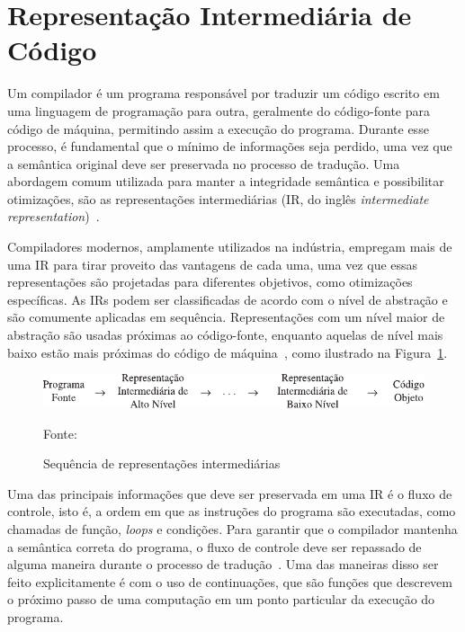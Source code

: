 \section{Representação Intermediária de Código}\label{sec:IR}

Um compilador é um programa responsável por traduzir um código escrito em uma linguagem de programação para outra, geralmente do código-fonte para código de máquina, permitindo assim a execução do programa.
Durante esse processo, é fundamental que o mínimo de informações seja perdido, uma vez que a semântica original deve ser preservada no processo de tradução.
Uma abordagem comum utilizada para manter a integridade semântica e possibilitar otimizações, são as representações intermediárias (IR, do inglês \textit{intermediate representation})~\cite{cooper2014construindo}.

Compiladores modernos, amplamente utilizados na indústria, empregam mais de uma IR para tirar proveito das vantagens de cada uma, uma vez que essas representações são projetadas para diferentes objetivos, como otimizações específicas.
As IRs podem ser classificadas de acordo com o nível de abstração e são comumente aplicadas em sequência.
Representações com um nível maior de abstração são usadas próximas ao código-fonte, enquanto aquelas de nível mais baixo estão mais próximas do código de máquina~\cite{aho2008compilers}, como ilustrado na Figura~\ref{fig:abstraction-level-irs}.

\begin{figure}[ht!]
  \centering
  \includegraphics[width=\textwidth]{Imagens/abstraction-level-irs.pdf}
  \caption{Sequência de representações intermediárias}\label{fig:abstraction-level-irs}
  \small{Fonte:~\cite{aho2008compilers}}
\end{figure}
Uma das principais informações que deve ser preservada em uma IR é o fluxo de controle, isto é, a ordem em que as instruções do programa são executadas, como chamadas de função, \textit{loops} e condições.
Para garantir que o compilador mantenha a semântica correta do programa, o fluxo de controle deve ser repassado de alguma maneira durante o processo de tradução~\cite{cooper2014construindo}.
Uma das maneiras disso ser feito explicitamente é com o uso de continuações, que são funções que descrevem o próximo passo de uma computação em um ponto particular da execução do programa.

